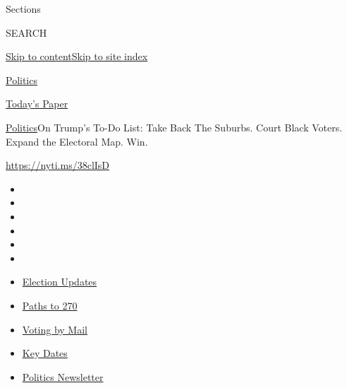 Sections

SEARCH

\protect\hyperlink{site-content}{Skip to
content}\protect\hyperlink{site-index}{Skip to site index}

\href{https://www.nytimes3xbfgragh.onion/section/politics}{Politics}

\href{https://myaccount.nytimes3xbfgragh.onion/auth/login?response_type=cookie\&client_id=vi}{}

\href{https://www.nytimes3xbfgragh.onion/section/todayspaper}{Today's
Paper}

\href{/section/politics}{Politics}\textbar{}On Trump's To-Do List: Take
Back The Suburbs. Court Black Voters. Expand the Electoral Map. Win.

\url{https://nyti.ms/38clIsD}

\begin{itemize}
\item
\item
\item
\item
\item
\item
\end{itemize}

\begin{itemize}
\item
  \href{https://www.nytimes3xbfgragh.onion/live/2020/09/08/us/trump-vs-biden?action=click\&pgtype=Article\&state=default\&region=TOP_BANNER\&context=storylines_menu}{Election
  Updates}
\item
  \href{https://www.nytimes3xbfgragh.onion/interactive/2020/us/elections/election-states-biden-trump.html?action=click\&pgtype=Article\&state=default\&region=TOP_BANNER\&context=storylines_menu}{Paths
  to 270}
\item
  \href{https://www.nytimes3xbfgragh.onion/interactive/2020/08/31/us/politics/vote-by-mail-deadlines.html?action=click\&pgtype=Article\&state=default\&region=TOP_BANNER\&context=storylines_menu}{Voting
  by Mail}
\item
  \href{https://www.nytimes3xbfgragh.onion/interactive/2019/us/elections/2020-presidential-election-calendar.html?action=click\&pgtype=Article\&state=default\&region=TOP_BANNER\&context=storylines_menu}{Key
  Dates}
\item
  \href{https://www.nytimes3xbfgragh.onion/newsletters/politics?action=click\&pgtype=Article\&state=default\&region=TOP_BANNER\&context=storylines_menu}{Politics
  Newsletter}
\end{itemize}

